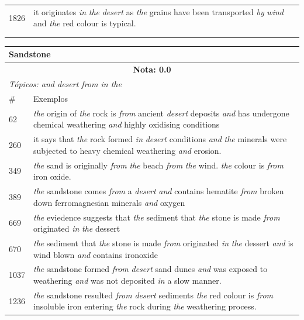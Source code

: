 \begin{table}
\begin{minipage}[t]{.45\textwidth}
\begin{tabular}{ p{1.5cm} | p{5cm}}
1826 & it originates \textit{in} \textit{the} \textit{desert} as \textit{the} grains have been transported \textit{by} \textit{wind} and \textit{the} red colour is typical.\\
\\
\\
\hline
\hline
\end{tabular}
\end{minipage} %
\hfill
\begin{minipage}[t]{.45\textwidth}
\begin{tabular}{ p{1.5cm} | p{5cm} }
\hline
\multicolumn{2}{l}{\textbf{Sandstone}} \\ \hline
\multicolumn{2}{c}{\textbf{Nota: 0.0}} \\ \hline 

\multicolumn{2}{l}{\textit{T{\'o}picos: and desert from in the}} \\ \hline
 \# & Exemplos \\ \hline
62 & \textit{the} origin of \textit{the} rock is \textit{from} ancient \textit{desert} deposits \textit{and} has undergone chemical weathering \textit{and} highly oxidising conditions\\ \hline
260 & it says that \textit{the} rock formed \textit{in} \textit{desert} conditions \textit{and} \textit{the} minerals were subjected to heavy chemical weathering \textit{and} erosion.\\ \hline
349 & \textit{the} sand is originally \textit{from} \textit{the} beach \textit{from} \textit{the} wind. \textit{the} colour is \textit{from} iron oxide.\\ \hline
389 & \textit{the} sandstone comes \textit{from} a \textit{desert} \textit{and} contains hematite \textit{from} broken down ferromagnesian minerals \textit{and} oxygen\\ \hline
669 & \textit{the} eviedence suggests that \textit{the} sediment that \textit{the} stone is made \textit{from} originated \textit{in} \textit{the} dessert\\ \hline
670 & \textit{the} sediment that \textit{the} stone is made \textit{from} originated \textit{in} \textit{the} dessert \textit{and} is wind blown \textit{and} contains ironoxide\\ \hline
1037 & \textit{the} sandstone formed \textit{from} \textit{desert} sand dunes \textit{and} was exposed to weathering \textit{and} was not deposited \textit{in} a slow manner.\\ \hline
1236 & \textit{the} sandstone resulted \textit{from} \textit{desert} sediments \textit{the} red colour is \textit{from} insoluble iron entering \textit{the} rock during \textit{the} weathering process.\\ \hline

\end{tabular}
\end{minipage}
\end{table}
